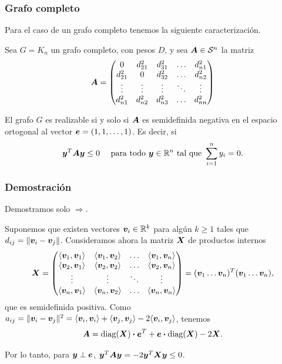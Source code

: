 \documentclass[aspectratio=169,12pt,spanish]{beamer}
\begin{document}
\begin{frame}
\frametitle{Grafo completo}

Para el caso de un grafo completo tenemos la siguiente caracterización.

\begin{theorem}
Sea $G = K_n$ un grafo completo, con pesos $D$, y sea $\bm{A} \in {\mathcal S}^{n}$ la matriz
{\small
$$
\bm{A} = \begin{pmatrix}
0 & d_{21}^2 & d_{31}^2 & \dots & d_{n1}^2 \\
d_{21}^2 & 0 & d_{32}^2 & \dots & d_{n2}^2 \\
\vdots & \vdots & \vdots & \ddots & \vdots \\
d_{n1}^2 & d_{n2}^2 & d_{n3}^2 & \dots & d_{nn}^2
\end{pmatrix}
$$}
\vspace{-0.5cm}

El grafo $G$ es realizable si y solo si $\bm{A}$ es semidefinida negativa en el espacio ortogonal al vector $\bm{e} = (1, 1, \dots, 1)$. Es decir, si
$$
\bm{y}^T \bm{A} \bm{y} \le 0 \quad \text{ para todo } \bm{y} \in \mathbb{R}^n \text{ tal que } \sum_{i=1}^n y_i = 0.
$$
\end{theorem}

\end{frame}


\begin{frame}
\frametitle{Demostración}

Demostramos solo $\Rightarrow$.

Suponemos que existen vectores $\bm{v}_i \in \mathbb{R}^k$ para algún $k \ge 1$ tales que $d_{ij} = \|\bm{v}_i - \bm{v}_j\|$. Consideramos ahora la matriz $\bm{X}$ de productos internos
$$
\Xb = \begin{pmatrix}
\innerl{\vb_1}{\vb_1} & \innerl{\vb_1}{\vb_2} & \dots & \innerl{\vb_1}{\vb_n} \\
\innerl{\vb_2}{\vb_1} & \innerl{\vb_2}{\vb_2} & \dots & \innerl{\vb_2}{\vb_n} \\
\vdots & \vdots & \ddots & \vdots \\
\innerl{\vb_n}{\vb_1} & \innerl{\vb_n}{\vb_2} & \dots & \innerl{\vb_n}{\vb_n}
\end{pmatrix} = (\vb_1 \dots \vb_n)^T (\vb_1 \dots \vb_n),
$$
que es semidefinida positiva. Como $a_{ij} = \| \bm{v}_i - \bm{v}_j\|^2 = \langle \bm{v}_i, \bm{v}_i \rangle + \langle \bm{v}_j, \bm{v}_j \rangle - 2 \langle \bm{v}_i, \bm{v}_j \rangle$, tenemos
$$
\bm{A} = \operatorname{diag}(\bm{X}) \boldsymbol{\cdot} \bm{e}^T + \bm{e} \boldsymbol{\cdot} \operatorname{diag}(\bm{X}) - 2 \bm{X}.
$$

Por lo tanto, para $\bm{y} \perp \bm{e}$, $\bm{y}^T \bm{A} \bm{y} = -2 \bm{y}^T \bm{X} \bm{y} \le 0$.


\end{frame}
\end{document}
